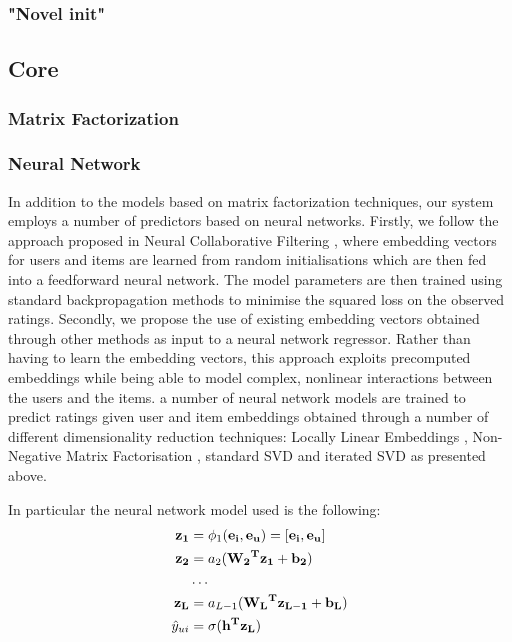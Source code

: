 \documentclass[10pt,conference,compsocconf]{IEEEtran}
\begin{document}
\subsubsection{"Novel init"}

\subsection{Core}
\subsubsection{Matrix Factorization}
\subsubsection{Neural Network}
In addition to the models based on matrix factorization techniques, our system employs a number of predictors based on neural networks. Firstly, we follow the approach proposed in Neural Collaborative Filtering \cite{he2017neural}, where embedding vectors for users and items are learned from random initialisations which are then fed into a feedforward neural network. The model parameters are then trained using standard backpropagation methods to minimise the squared loss on the observed ratings. 
Secondly, we propose the use of existing embedding vectors obtained through other methods as input to a neural network regressor. Rather than having to learn the embedding vectors, this approach exploits precomputed embeddings while being able to model complex, nonlinear interactions  between the users and the items. 
a number of neural network models are trained to predict ratings given user and item embeddings obtained through a number of different dimensionality reduction techniques: Locally Linear Embeddings \cite{roweis2000nonlinear}, Non-Negative Matrix Factorisation \cite{cichocki2009fast}, standard SVD and iterated SVD as presented above.

In particular the neural network model used is the following:
\begin{equation}
\begin{aligned}
    \bf{z_1} &= \phi_1(\bf{e_i}, \bf{e_u}) = [\bf{e_i}, \bf{e_u}]\\
    \bf{z_2} &= a_2(\bf{W_2}^T \bf{z_1} + b_2) \\
    &\dots \\
    \bf{z_L} &= a_{L - 1 }(\bf{W_{L}}^T \bf{z_{L - 1}} + b_L) \\
    \hat y_{ui} &= \sigma(\bf{h}^T \bf{z_L})
\end{aligned}
\end{equation}
\end{document}
